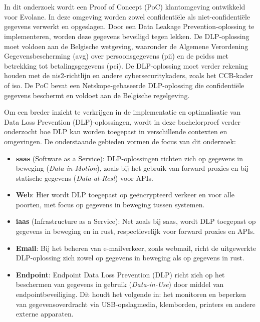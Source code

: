 \section{}%
\label{sec:onderzoeksdoelstelling}

In dit onderzoek wordt een Proof of Concept (PoC) klantomgeving ontwikkeld voor Evolane. 
In deze omgeving worden zowel confidentiële als niet-confidentiële gegevens verwerkt en opgeslagen. 
Door een Data Leakage Prevention-oplossing te implementeren, worden deze gegevens beveiligd tegen lekken. De DLP-oplossing moet voldoen aan de Belgische wetgeving, 
waaronder de Algemene Verordening Gegevensbescherming (\gls{avg}) over persoonsgegevens (\gls{pii}) en de \gls{pcidss} met betrekking tot betalingsgegevens (\gls{pci}). 
De DLP-oplossing moet verder rekening houden met de \gls{nis2}-richtlijn en andere cybersecuritykaders, zoals het CCB-kader of \gls{iso}. 
De PoC bevat een Netskope-gebaseerde DLP-oplossing die confidentiële gegevens beschermt en voldoet aan de Belgische regelgeving. 

Om een breder inzicht te verkrijgen in de implementatie en optimalisatie van Data Loss Prevention (DLP)-oplossingen, wordt in deze bachelorproef verder onderzocht hoe DLP kan worden toegepast in verschillende contexten en omgevingen. De onderstaande gebieden vormen de focus van dit onderzoek:

\begin{itemize}
\item \textbf{\gls{saas}} (Software as a Service): DLP-oplossingen richten zich op gegevens in beweging (\textit{Data-in-Motion}), zoals bij het gebruik van forward proxies en bij statische gegevens (\textit{Data-at-Rest}) voor APIs.
\item \textbf{Web}: Hier wordt DLP toegepast op geëncrypteerd verkeer en voor alle poorten, met focus op gegevens in beweging tussen systemen.
\item \textbf{\gls{iaas}} (Infrastructure as a Service): Net zoals bij \gls{saas}, wordt DLP toegepast op gegevens in beweging en in rust, respectievelijk voor forward proxies en APIs.
\item \textbf{Email}: Bij het beheren van e-mailverkeer, zoals webmail, richt de uitgewerkte DLP-oplossing zich zowel op gegevens in beweging als op gegevens in rust.
\item \textbf{Endpoint}: Endpoint Data Loss Prevention (DLP) richt zich op het beschermen van gegevens in gebruik (\textit{Data-in-Use}) door middel van endpointbeveiliging. Dit houdt het volgende in: het monitoren en beperken van gegevensoverdracht via USB-opslagmedia, klemborden, printers en andere externe apparaten.
\end{itemize}



